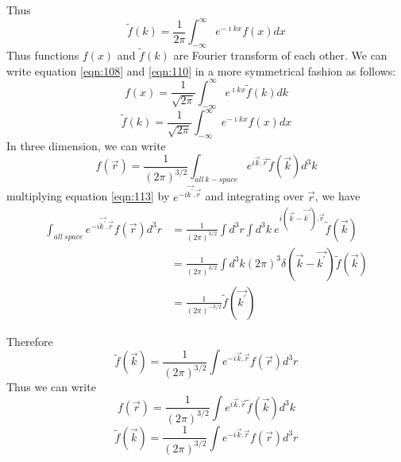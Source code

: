 		Thus
		\begin{equation}\label{eqn:110}
			\tilde{f}(k) = \frac{1}{2\pi} \int_{-\infty}^{\infty} e^{-\imath k x} f(x) dx
		\end{equation}
		Thus functions $f(x)$ and $\tilde{f}(k)$ are Fourier transform of each other. We can write equation \ref{eqn:108} and \ref{eqn:110} in a more symmetrical fashion as follows:
		\begin{equation}\label{eqn:111}
		f(x) = \frac{1}{\sqrt{2\pi}} \int_{-\infty}^{\infty} e^{\imath k x} \tilde{f}(k) dk
		\end{equation}
		\begin{equation}\label{eqn:112}
			\tilde{f}(k) = \frac{1}{\sqrt{2\pi}} \int_{-\infty}^{\infty} e^{-\imath k x} f(x) dx
		\end{equation}
		In three dimension, we can write
		\begin{equation}\label{eqn:113}
			f(\vec{r}) = \frac{1}{(2\pi)^{3/2}} \int_{all\ k-space} e^{i \vec{k} . \vec{r}} \tilde{f}(\vec{k}) d^3k
		\end{equation}
		multiplying equation \ref{eqn:113} by $e^{-i\vec{k^\prime} . \vec{r}} $ and integrating over $\vec{r}$, we have
		\begin{eqnarray}\label{eqn:114}
			\int_{all\ space} e^{-i\vec{k^\prime} . \vec{r}} f(\vec{r}) d^3 r
			&= \frac{1}{(2\pi)^{3/2}} \int d^3 r \int d^3 k \ e^{i (\vec{k} - \vec{k^\prime}). \vec{r}} \tilde{f}(\vec{k}) \nonumber \\
			&= \frac{1}{(2\pi)^{3/2}} \int d^3 k (2\pi)^3 \delta(\vec{k} - \vec{k^\prime}) \tilde{f}(\vec{k}) \nonumber \\
			&= \frac{1}{(2\pi)^{-3/2}} \tilde{f}(\vec{k^\prime})
		\end{eqnarray}
		
		Therefore
		\begin{equation}\label{eqn:115}
			\tilde{f}(\vec{k}) = \frac{1}{(2\pi)^{3/2}} \int e^{-i\vec{k} . \vec{r}} f(\vec{r}) d^3 r
		\end{equation}
		Thus we can write 
		\begin{equation}\label{eqn:116}
		f(\vec{r}) = \frac{1}{(2\pi)^{3/2}} \int e^{i\vec{k} . \vec{r}} \tilde{f}(\vec{k}) d^3 k
		\end{equation}
		\begin{equation}\label{eqn:117}
		\tilde{f}(\vec{k}) = \frac{1}{(2\pi)^{3/2}} \int e^{-i\vec{k} . \vec{r}} f(\vec{r}) d^3 r
		\end{equation}
		
